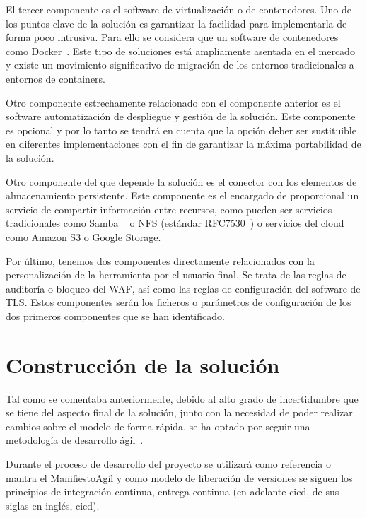 \par El tercer componente es el software de virtualización o de contenedores. Uno de los puntos clave de la solución es garantizar la facilidad para implementarla de forma poco intrusiva. Para ello se considera
que un software de contenedores como Docker~\cite{docker}. Este tipo de soluciones está ampliamente asentada en el mercado y existe un movimiento significativo de migración de los entornos tradicionales a entornos de containers.

\par Otro componente estrechamente relacionado con el componente anterior es el software automatización de despliegue y gestión de la solución. Este componente es opcional y por lo tanto se tendrá en cuenta que la opción deber ser sustituible
en diferentes implementaciones con el fin de garantizar la máxima portabilidad de la solución.

\par Otro componente del que depende la solución es el conector con los elementos de almacenamiento persistente. Este componente es el encargado de proporcional un servicio de compartir información entre recursos, como pueden ser servicios
tradicionales como Samba ~\cite{samba} o  NFS (estándar RFC7530~\cite{nfs}) o servicios del cloud como Amazon S3\cite{s3} o Google Storage\cite{GoogleStorage}.

\par Por último, tenemos dos componentes directamente relacionados con la personalización de la herramienta por el usuario final. Se trata de las reglas de auditoría o bloqueo del WAF, así como las reglas de configuración
del software de TLS. Estos componentes serán los ficheros o parámetros de configuración de los dos primeros componentes que se han identificado.

\chapter{Construcción de la solución}

\par Tal como se comentaba anteriormente, debido al alto grado de incertidumbre que se tiene del aspecto final de la solución, junto con la necesidad de poder realizar cambios sobre el modelo de forma rápida, se ha optado por seguir una metodología de desarrollo ágil~\cite{wiki:agil}.
\par Durante el proceso de desarrollo del proyecto se utilizará como referencia o mantra el \Gls{ManifiestoAgil} y como modelo de liberación de versiones se siguen los principios
de integración continua, entrega continua (en adelante \acrshort{cicd}, de sus siglas en inglés, \acrlong{cicd}).

